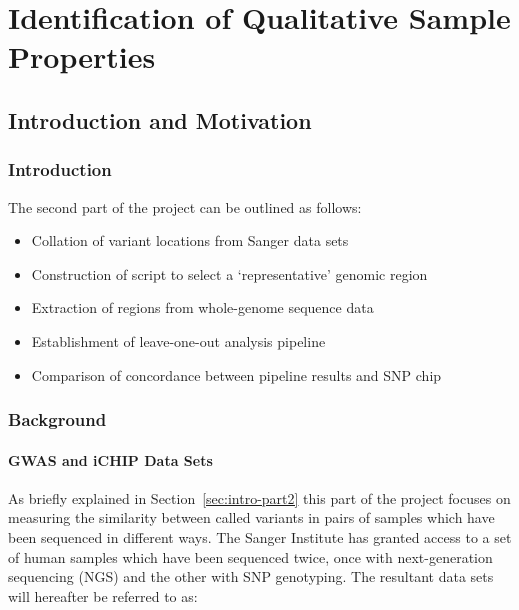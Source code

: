 \part{Identification of Qualitative Sample Properties}
\chapter{Introduction and Motivation}
\ifpdf
    \graphicspath{{Chapter5/Figs/Raster/}{Chapter5/Figs/PDF/}{Chapter5/Figs/}}
\else
    \graphicspath{{Chapter5/Figs/Vector/}{Chapter5/Figs/}}
\fi

\section{Introduction}

The second part of the project can be outlined as follows:

\begin{itemize}
    \item Collation of variant locations from Sanger data sets
    \item Construction of script to select a `representative' genomic region
    \item Extraction of regions from whole-genome sequence data
    \item Establishment of leave-one-out analysis pipeline
    \item Comparison of concordance between pipeline results and SNP chip
\end{itemize}

\section{Background}
\subsection{GWAS and iCHIP Data Sets}

As briefly explained in Section~\ref{sec:intro-part2} this part of the project
focuses on measuring the similarity between called variants in pairs of
samples which have been sequenced in different ways. The Sanger Institute has
granted access to a set of human samples which have been sequenced twice, once
with next-generation sequencing (NGS) and the other with SNP genotyping.
The resultant data sets will hereafter be referred to as:

